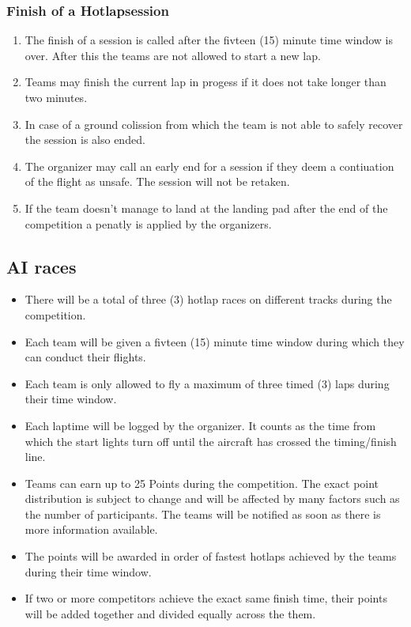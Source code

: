     \subsubsection{Finish of a Hotlapsession}
    \begin{enumerate}
      \item The finish of a session is called after the fivteen (15) minute time window is over. After this the teams are not allowed to start a new lap.
      \item Teams may finish the current lap in progess if it does not take longer than two minutes.
      \item In case of a ground colission from which the team is not able to safely recover the session is also ended. 
      \item The organizer may call an early end for a session if they deem a contiuation of the flight as unsafe. The session will not be retaken.  
      \item If the team doesn't manage to land at the landing pad after the end of the competition a penatly is applied by the organizers.
    \end{enumerate}

    \subsection{AI races}
    \begin{itemize}
      \item There will be a total of three (3) hotlap races on different tracks during the competition. 
      \item Each team will be given a fivteen (15) minute time window during which they can conduct their flights. 
      \item Each team is only allowed to fly a maximum of three timed (3) laps during their time window. 
      \item Each laptime will be logged by the organizer. It counts as the time from which the start lights turn off until the aircraft has crossed the timing/finish line. 
      \item Teams can earn up to 25 Points during the competition. The exact point distribution is subject to change and will be affected by many factors such as the number of participants.
      The teams will be notified as soon as there is more information available.
      \item The points will be awarded in order of fastest hotlaps achieved by the teams during their time window.
      \item If two or more competitors achieve the exact same finish time, their points will be added together and divided equally across the them.  
    \end{itemize}

